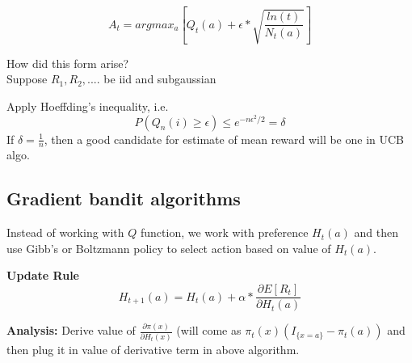 \documentclass{book}
\begin{document}
$$
A_{t} = argmax_{a} [Q_{t}(a) + \epsilon * \sqrt{\frac{ln(t)}{N_{t}(a)}}]
$$

How did this form arise?\\

Suppose $R_{1}, R_{2}, ....$ be iid and subgaussian

Apply Hoeffding's inequality, i.e.\\

$$
P (Q_{n}(i) \geq \epsilon) \leq e^{-n\epsilon^{2}/2} = \delta
$$
If $\delta = \frac{1}{n}$, then a good candidate for estimate of mean reward will be one in UCB algo.

\subsection{Gradient bandit algorithms}
Instead of working with $Q$ function, we work with preference $H_{t}(a)$ and then use Gibb's or Boltzmann policy to select action based on value of $H_{t}(a)$.

\textbf{Update Rule}\\
$$
H_{t+1}(a) = H_{t}(a) + \alpha* \frac{\partial E[R_{t}]}{\partial H_{t}(a)}
$$

\textbf{Analysis:}
Derive value of $\frac{\partial \pi(x)}{\partial H_{t}(x)}$ (will come as $\pi_{t}(x) (I_{\{x = a\}} - \pi_{t}(a))$ and then plug it in value of derivative term in  above algorithm.
\end{document}
